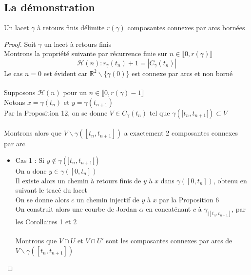 \documentclass{article}
\begin{document}
\begin{flushleft}
\vspace*{3cm}

\subsection{La démonstration}

\begin{tcolorbox}[colback=purple!20!white, colframe=purple!60!white, title = Théorème des retours]
    Un lacet $\gamma$ à retours finis délimite $r(\gamma)$ composantes connexes par arcs bornées
\end{tcolorbox}

\begin{proof}
    Soit $\gamma$ un lacet à retours finis\\
    Montrons la propriété suivante par récurrence finie sur $n \in \llbracket 0, r(\gamma) \rrbracket$
    \[ \mathcal{H}(n) : r_{\gamma}(t_n) + 1 = |C_{\gamma}(t_n)| \]
    Le cas $n = 0$ est évident car $\mathbb{R}^2 \backslash \{ \gamma(0) \}$ est connexe par arcs et non borné
    \\~\\
    Supposons $\mathcal{H}(n)$ pour un $n \in \llbracket 0, r(\gamma)-1 \rrbracket$\\
    Notons $x = \gamma(t_n)$ et $y = \gamma(t_{n+1})$\\
    Par la Proposition 12, on se donne $V \in C_{\gamma}(t_n)$ tel que $\gamma(]t_n, t_{n+1}[) \subset V$
    \\~\\
    Montrons alors que $V \backslash \gamma([t_n, t_{n+1}])$ a exactement 2 composantes connexes par arc
    \begin{itemize}
        \item Cas 1 : Si $y \notin \gamma(]t_n, t_{n+1}[)$\\
        On a donc $y \in \gamma([0, t_n])$\\
        Il existe alors un chemin à retours finis de $y$ à $x$ dans $\gamma([0, t_n])$, obtenu en suivant le tracé du lacet\\
        On se donne alors $c$ un chemin injectif de $y$ à $x$ par la Proposition 6\\
        On construit alors une courbe de Jordan $\alpha$ en concaténant $c$ à $\gamma_{\mid [t_n, t_{n+1}]}$, par les Corollaires 1 et 2
        \\~\\
        Montrons que $V \cap U$ et $V \cap U'$ sont les composantes connexes par arcs de $V \backslash \gamma([t_n, t_{n+1}])$\\

\end{itemize}
\end{proof}
\end{flushleft}
\end{document}
